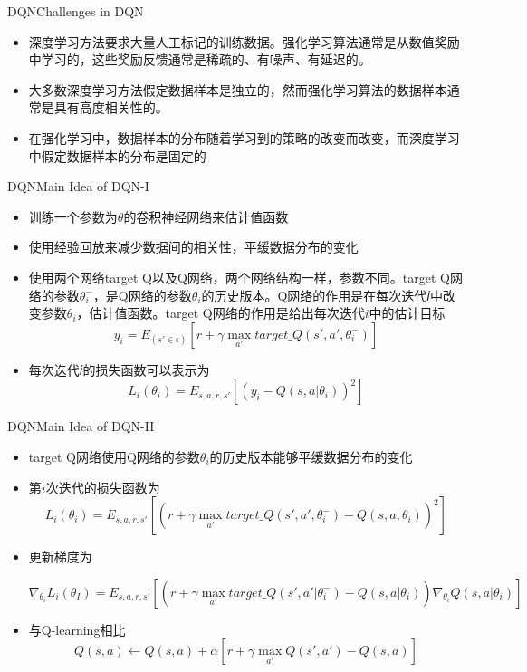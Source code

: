 \documentclass[10pt]{beamer}
\begin{document}
	\begin{frame}{DQN}{Challenges in DQN}
		\begin{itemize}
			\item<2-> 深度学习方法要求大量人工标记的训练数据。强化学习算法通常是从数值奖励中学习的，这些奖励反馈通常是稀疏的、有噪声、有延迟的。
			
			\item<3-> 大多数深度学习方法假定数据样本是独立的，然而强化学习算法的数据样本通常是具有高度相关性的。
			
			\item<4-> 在强化学习中，数据样本的分布随着学习到的策略的改变而改变，而深度学习中假定数据样本的分布是固定的
			
		\end{itemize}
	\end{frame}

	\begin{frame}{DQN}{Main Idea of DQN-I}
		\begin{itemize}
			\item 训练一个参数为$\theta$的卷积神经网络来估计值函数
			
			\item 使用经验回放来减少数据间的相关性，平缓数据分布的变化
			
			\item 使用两个网络target Q以及Q网络，两个网络结构一样，参数不同。target Q网络的参数$\theta_i^-$，是Q网络的参数$\theta_i$的历史版本。Q网络的作用是在每次迭代𝑖中改变参数$\theta_i$，估计值函数。target Q网络的作用是给出每次迭代$i$中的估计目标
			\[y_i = E_(s' \in \epsilon)[r + \gamma \max_{a'} target\_Q(s',a',\theta_i^-)] \]
			
			\item 每次迭代𝑖的损失函数可以表示为
			\[L_i(\theta_i) = E_{s,a,r,s'}[(y_i - Q(s,a| \theta_i))^2] \]
			
		\end{itemize}
	\end{frame}

	\begin{frame}{DQN}{Main Idea of DQN-II}
		\begin{itemize}
			\item target Q网络使用Q网络的参数$\theta_i$的历史版本能够平缓数据分布的变化
			
			\item 第$i$次迭代的损失函数为
			\[L_i(\theta_i)=E_{s,a,r,s'}[(r + \gamma \max_{a'}target\_Q(s',a',\theta_i^-) - Q(s,a,\theta_i))^2] \]
			
			\item 更新梯度为
				\begin{small}
					\[\nabla_{\theta_i}L_i(\theta_I) = E_{s,a,r,s'}[(r + \gamma \max_{a'} target\_Q(s',a'|\theta_i^-) - Q(s,a|\theta_i))\nabla_{\theta_i}Q(s,a|\theta_i)] \]
				\end{small}
			
			\item 与Q-learning相比
			\[ Q(s, a) \gets Q(s, a) + \alpha \left[r + \gamma \max_{a'}Q(s', a') - Q(s, a) \right] \]
			
		\end{itemize}
	\end{frame}
\end{document}
